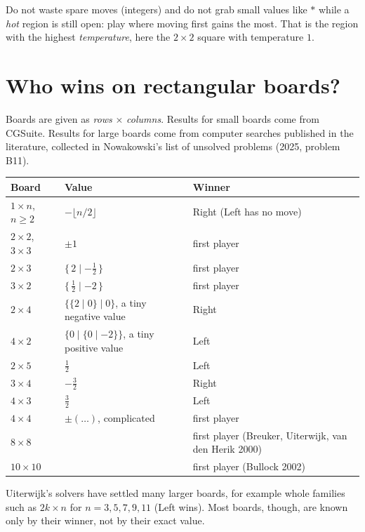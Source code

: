 \documentclass[11pt,a4paper]{article}
\newcommand{\dm}{\mathbin{\vert}}  %
\newcommand{\game}[2]{\{\,#1 \dm #2\,\}}
\begin{document}
\begin{keybox}[title=Strategy in one sentence]
Do not waste spare moves (integers) and do not grab small values like $*$ while a \emph{hot}
region is still open: play where moving first gains the most.  That is the region with the
highest \emph{temperature}, here the $2\times2$ square with temperature $1$.
\end{keybox}

\section{Who wins on rectangular boards?}
\label{sec:boards}

Boards are given as \emph{rows} $\times$ \emph{columns}.  Results for small boards come from
CGSuite.  Results for large boards come from computer searches published in the literature,
collected in Nowakowski's list of unsolved problems (2025, problem B11).

\begin{center}
\begin{tabular}{@{}lll@{}}
\toprule
Board & Value & Winner \\
\midrule
$1\times n$, $n\ge2$ & $-\lfloor n/2\rfloor$ & Right (Left has no move) \\
$2\times2$, $3\times3$ & $\pm1$ & first player \\
$2\times3$ & $\game{2}{-\tfrac12}$ & first player \\
$3\times2$ & $\game{\tfrac12}{-2}$ & first player \\
$2\times4$ & $\{\{2\mid0\}\mid0\}$, a tiny negative value & Right \\
$4\times2$ & $\{0\mid\{0\mid-2\}\}$, a tiny positive value & Left \\
$2\times5$ & $\tfrac12$ & Left \\
$3\times4$ & $-\tfrac32$ & Right \\
$4\times3$ & $\tfrac32$ & Left \\
$4\times4$ & $\pm(\ldots)$, complicated & first player \\
\midrule
$8\times8$ & & first player (Breuker, Uiterwijk, van den Herik 2000) \\
$10\times10$ & & first player (Bullock 2002) \\
\bottomrule
\end{tabular}
\end{center}

Uiterwijk's solvers have settled many larger boards, for example whole families such as
$2k\times n$ for $n=3,5,7,9,11$ (Left wins).  Most boards, though, are known only by their
winner, not by their exact value.
\end{document}
